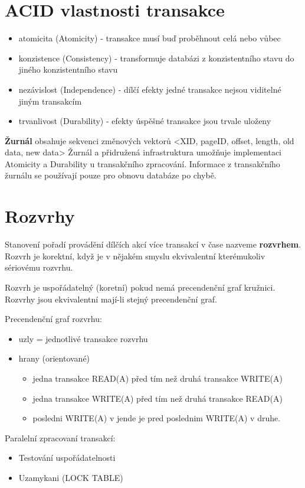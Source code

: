 \documentclass{szzclass}
\begin{document}
\section{ACID vlastnosti transakce}
\begin{itemize}
\item atomicita (Atomicity) - transakce musí buď proběhnout celá nebo vůbec
\item konzistence (Consistency) - transformuje databázi z konzistentního stavu do jiného konzistentního stavu
\item nezávislost (Independence) - dílčí efekty jedné transakce nejsou viditelné jiným transakcím
\item trvanlivost (Durability) - efekty úspěšné transakce jsou trvale uloženy
\end{itemize}

\textbf{Žurnál} obsahuje sekvenci změnových vektorů <XID, pageID, offset, length, old data, new data>
Žurnál a přidružená infrastruktura umožňuje implementaci Atomicity a Durability u transakčního zpracování.
Informace z transakčního žurnálu se používají pouze pro obnovu databáze po chybě.

\section{Rozvrhy}
Stanovení pořadí provádění dílčích akcí více transakcí v čase nazveme \textbf{rozvrhem}. Rozvrh je korektní, když je v nějakém smyslu ekvivalentní kterémukoliv sériovému rozvrhu.

Rozvrh je uspořádatelný (koretní) pokud nemá precendenční graf kružnici.
Rozvrhy jsou ekvivalentní mají-li stejný precendenční graf.

Precendenční graf rozvrhu:
\begin{itemize}
\item uzly = jednotlivé transakce rozvrhu
\item hrany (orientované)
  \begin{itemize}
  \item jedna transakce READ(A) před tím než druhá transakce WRITE(A)
  \item jedna transakce WRITE(A) před tím než druhá transakce READ(A)
  \item posledni WRITE(A) v jende je pred poslednim WRITE(A) v druhe. 
  \end{itemize}
\end{itemize}

Paralelní zpracovaní transakcí:
\begin{itemize}
\item Testování uspořádatelnosti
\item Uzamykani (LOCK TABLE)
\end{itemize}
\end{document}
